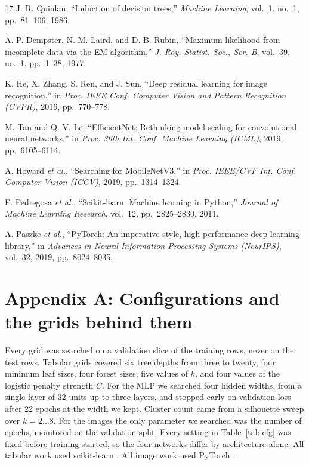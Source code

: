 \documentclass[11pt,journal,a4paper]{IEEEtran}
\begin{document}
\begin{thebibliography}{17}
J. R. Quinlan, ``Induction of decision trees,'' \emph{Machine Learning}, vol.~1, no.~1, pp.~81--106, 1986.

A. P. Dempster, N. M. Laird, and D. B. Rubin, ``Maximum likelihood from incomplete data via the EM algorithm,''
\emph{J. Roy. Statist. Soc., Ser. B}, vol.~39, no.~1, pp.~1--38, 1977.

K. He, X. Zhang, S. Ren, and J. Sun, ``Deep residual learning for image recognition,'' in \emph{Proc. IEEE
Conf. Computer Vision and Pattern Recognition (CVPR)}, 2016, pp.~770--778.

M. Tan and Q. V. Le, ``EfficientNet: Rethinking model scaling for convolutional neural networks,'' in
\emph{Proc. 36th Int. Conf. Machine Learning (ICML)}, 2019, pp.~6105--6114.

A. Howard \emph{et al.}, ``Searching for MobileNetV3,'' in \emph{Proc. IEEE/CVF Int. Conf. Computer Vision
(ICCV)}, 2019, pp.~1314--1324.

F. Pedregosa \emph{et al.}, ``Scikit-learn: Machine learning in Python,'' \emph{Journal of Machine Learning
Research}, vol.~12, pp.~2825--2830, 2011.

A. Paszke \emph{et al.}, ``PyTorch: An imperative style, high-performance deep learning library,'' in
\emph{Advances in Neural Information Processing Systems (NeurIPS)}, vol.~32, 2019, pp.~8024--8035.

\end{thebibliography}
\normalsize

\clearpage

\onecolumn
\section*{Appendix A: Configurations and the grids behind them}

Every grid was searched on a validation slice of the training rows, never on the test rows. Tabular grids covered six tree depths from three to twenty, four minimum leaf sizes, four forest sizes, five values of $k$, and
four values of the logistic penalty strength $C$. For the MLP we searched four hidden widths, from a single layer of 32 units up to three layers, and stopped early on validation loss after 22 epochs at the width we kept. Cluster
count came from a silhouette sweep over $k=2\dots8$. For the images the only parameter we searched was the number
of epochs, monitored on the validation split. Every setting in Table~\ref{tab:cfg} was fixed before training
started, so the four networks differ by architecture alone. All tabular work used scikit-learn
\cite{pedregosa2011scikit}. All image work used PyTorch \cite{paszke2019pytorch}.
\end{document}

